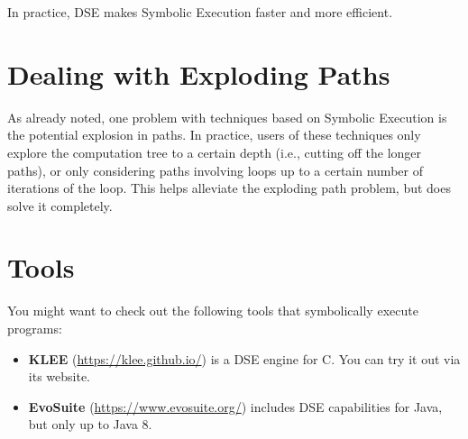 In practice, DSE makes Symbolic Execution faster and more efficient. 

\section{Dealing with Exploding Paths}

As already noted, one problem with techniques based on Symbolic Execution is the
potential explosion in paths. In practice, users of these techniques only
explore the computation tree to a certain depth (i.e., cutting off the longer
paths), or only considering paths involving loops up to a certain number of
iterations of the loop. This helps alleviate the exploding path problem, but
does solve it completely.

\section{Tools}

You might want to check out the following tools that symbolically execute
programs:

\begin{itemize}

    \item {\bf KLEE} (\url{https://klee.github.io/}) is a DSE engine for C. You
can try it out via its website.

    \item {\bf EvoSuite} (\url{https://www.evosuite.org/}) includes DSE
capabilities for Java, but only up to Java 8.

\end{itemize}

